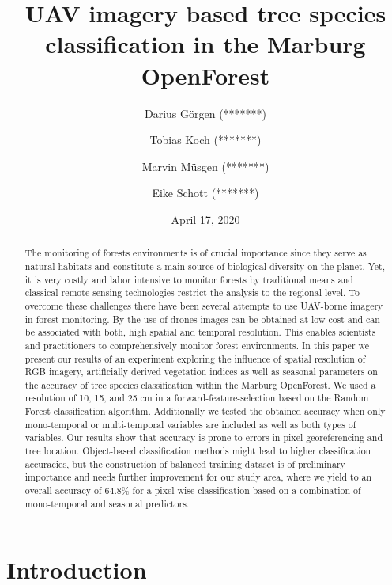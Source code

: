 \documentclass[]{article}
\title{UAV imagery based tree species classification in the Marburg OpenForest}
\author{Darius Görgen (*******) \and Tobias Koch (*******) \and Marvin Müsgen (*******) \and Eike Schott (*******)}
\date{April 17, 2020}
\begin{document}
\maketitle
\begin{abstract}
The monitoring of forests environments is of crucial importance since
they serve as natural habitats and constitute a main source of
biological diversity on the planet. Yet, it is very costly and labor
intensive to monitor forests by traditional means and classical remote
sensing technologies restrict the analysis to the regional level. To
overcome these challenges there have been several attempts to use
UAV-borne imagery in forest monitoring. By the use of drones images can
be obtained at low cost and can be associated with both, high spatial
and temporal resolution. This enables scientists and practitioners to
comprehensively monitor forest environments. In this paper we present
our results of an experiment exploring the influence of spatial
resolution of RGB imagery, artificially derived vegetation indices as
well as seasonal parameters on the accuracy of tree species
classification within the Marburg OpenForest. We used a resolution of
10, 15, and 25 cm in a forward-feature-selection based on the Random
Forest classification algorithm. Additionally we tested the obtained
accuracy when only mono-temporal or multi-temporal variables are
included as well as both types of variables. Our results show that
accuracy is prone to errors in pixel georeferencing and tree location.
Object-based classification methods might lead to higher classification
accuracies, but the construction of balanced training dataset is of
preliminary importance and needs further improvement for our study area,
where we yield to an overall accuracy of 64.8\% for a pixel-wise
classification based on a combination of mono-temporal and seasonal
predictors.
\end{abstract}

{
\setcounter{tocdepth}{2}
\tableofcontents
}
\newpage

\hypertarget{introduction}{%
\section{Introduction}\label{introduction}}
\end{document}
